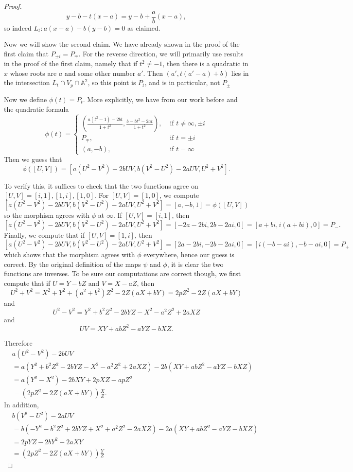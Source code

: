 \documentclass{article}
\theoremstyle{customplain}
\theoremstyle{customdef}
\newcommand{\A}{\mathbb{A}}
\theoremstyle{definition} %
\begin{document}
\begin{proof}
    \[
    y-b-t(x-a)=y-b+\frac{a}{b}(x-a),
    \]
    so indeed $L_t:a(x-a)+b(y-b)=0$ as claimed.

    Now we will show the second claim. We have already shown in the proof of the first claim that $P_{\pm i} = P_{\mp}.$ For the reverse direction, we will primarily use results in the proof of the first claim, namely that if $t^2\ne -1$, then there is a quadratic in $x$ whose roots are $a$ and some other number $a'$. Then $(a', t(a'-a)+b)$ lies in the intersection $L_t\cap V_p\cap \A^2$, so this point is $P_t$, and is in particular, not $P_{\pm}$

    Now we define $\phi(t)=P_t$. More explicitly, we have from our work before and the quadratic formula
    \[
    \phi(t) = \begin{cases}
        \left(\frac{a(t^2-1)-2bt}{1+t^2}, \frac{b-bt^2-2at}{1+t^2}\right), & \text{ if } t\ne \infty, \pm i\\
        P_\mp, & \text{ if } t=\pm i\\
        (a,-b), & \text{ if } t = \infty
    \end{cases}
    \]
    Then we guess that $$\phi([U,V]) = [a(U^2-V^2)-2bUV, b(V^2-U^2)-2aUV, U^2+V^2].$$

    To verify this, it suffices to check that the two functions agree on $[U,V]=[i,1],[1,i], [1,0].$ For $[U,V]=[1,0]$, we compute
    \[
    [a(U^2-V^2)-2bUV, b(V^2-U^2)-2aUV, U^2+V^2] = [a,-b,1]=\phi([U,V])
    \]
    so the morphism agrees with $\phi$ at $\infty.$ If $[U,V]=[i,1]$, then
    \[
    [a(U^2-V^2)-2bUV, b(V^2-U^2)-2aUV, U^2+V^2] = [-2a-2bi, 2b-2ai, 0]=[a+bi, i(a+bi),0] =P_-.
    \]
    Finally, we compute that if $[U,V]=[1,i]$, then
    \[
    [a(U^2-V^2)-2bUV, b(V^2-U^2)-2aUV, U^2+V^2] = [2a-2bi, -2b-2ai, 0] = [i(-b-ai), -b-ai,0]=P_+
    \]
    which shows that the morphism agrees with $\phi$ everywhere, hence our guess is correct.
    By the original definition of the maps $\psi$ and $\phi$, it is clear the two functions are inverses. To be sure our computations are correct though, we first compute that if $U=Y-bZ$ and $V=X-aZ$, then
    \[
    U^2+V^2=X^2+Y^2+(a^2+b^2)Z^2-2Z(aX+bY)= 2pZ^2-2Z(aX+bY)
    \]
    and
    \[
    U^2-V^2 = Y^2+b^2Z^2-2bYZ-X^2-a^2Z^2+2aXZ
    \]
    and 
    \[
    UV = XY+abZ^2-aYZ-bXZ.
    \]

    Therefore
    \begin{align*}
        &a(U^2-V^2)-2bUV\\
        &= a(Y^2+b^2Z^2-2bYZ-X^2-a^2Z^2+2aXZ)-2b(XY+abZ^2-aYZ-bXZ) \\
        &= a(Y^2-X^2)-2bXY+2pXZ-apZ^2\\
        & = (2pZ^2-2Z(aX+bY)) \frac{X}{Z}.
    \end{align*}
   In addition,
   \begin{align*}
       &b(V^2-U^2)-2aUV \\
       &= b(-Y^2-b^2Z^2+2bYZ+X^2+a^2Z^2-2aXZ)-2a(XY+abZ^2-aYZ-bXZ)\\
       &= 2pYZ-2bY^2-2aXY\\
       & = (2pZ^2-2Z(aX+bY)) \frac{Y}{Z}
   \end{align*}
    

\end{proof}
\end{document}
